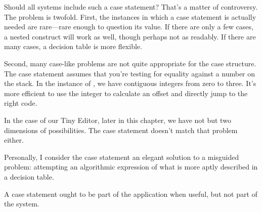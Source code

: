 Should all \Forth{} systems include such a case statement? That's
a matter of controversy. The problem is twofold. First, the instances in
which a case statement is actually needed are rare---rare enough to
question its value. If there are only a few cases, a nested 
construct will work as well, though perhaps not as readably. If there are
many cases, a decision table is more flexible.

Second, many case-like problems are not quite appropriate for the
case structure. The  case statement assumes that you're testing for
equality against a number on the stack. In the instance of , we have
contiguous integers from zero to three. It's more efficient to use the
integer to calculate an offset and directly jump to the right code.

In the case of our Tiny Editor, later in this chapter, we have not but
two dimensions of possibilities. The case statement doesn't match that
problem either.

Personally, I consider the case statement an elegant solution to a
misguided problem: attempting an algorithmic expression of what is
more aptly described in a decision table.

A case statement ought to be part of the application when useful,
but not part of the system.%
%

